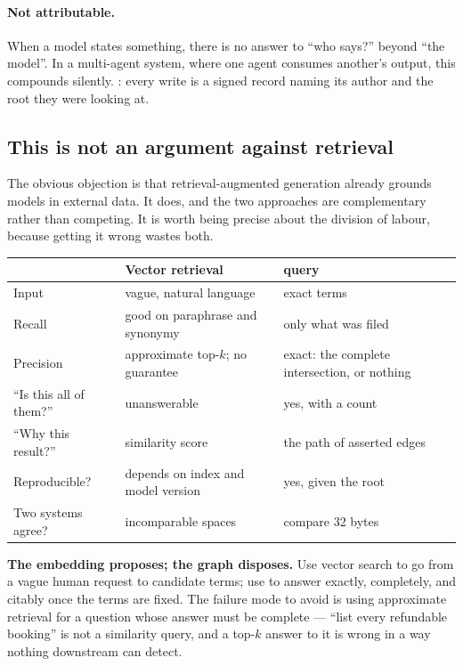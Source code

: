 \paragraph{Not attributable.} When a model states something, there is no
answer to ``who says?'' beyond ``the model''. In a multi-agent system, where
one agent consumes another's output, this compounds silently. \odag{}: every
write is a signed record naming its author and the root they were looking at.

\subsection{This is not an argument against retrieval}

The obvious objection is that retrieval-augmented generation
\citep{lewis2020} already grounds models in external data. It does, and the
two approaches are complementary rather than competing. It is worth being
precise about the division of labour, because getting it wrong wastes both.

\begin{center}\small
\begin{tabularx}{\textwidth}{@{}p{3.5cm} X X@{}}
\toprule
& \textbf{Vector retrieval} & \textbf{\odag{} query}\\
\midrule
Input & vague, natural language & exact terms\\
Recall & good on paraphrase and synonymy & only what was filed\\
Precision & approximate top-$k$; no guarantee & exact: the complete
  intersection, or nothing\\
``Is this all of them?'' & unanswerable & yes, with a count\\
``Why this result?'' & similarity score & the path of asserted edges\\
Reproducible? & depends on index and model version & yes, given the root\\
Two systems agree? & incomparable spaces & compare 32 bytes\\
\bottomrule
\end{tabularx}
\end{center}

\begin{keyidea}
\textbf{The embedding proposes; the graph disposes.} Use vector search to go
from a vague human request to candidate terms; use \odag{} to answer exactly,
completely, and citably once the terms are fixed. The failure mode to avoid is
using approximate retrieval for a question whose answer must be complete ---
``list every refundable booking'' is not a similarity query, and a top-$k$
answer to it is wrong in a way nothing downstream can detect.
\end{keyidea}

